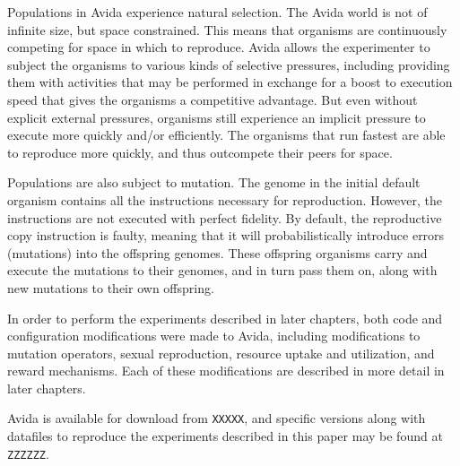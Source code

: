 Populations in Avida experience natural selection. The Avida world is not of infinite size, but space constrained. This means that organisms are continuously competing for space in which to reproduce.  Avida allows the experimenter to subject the organisms to various kinds of selective pressures, including providing them with activities that may be performed in exchange for a boost to execution speed that gives the organisms a competitive advantage. But even without explicit external pressures, organisms still experience an implicit pressure to execute more quickly and/or efficiently. The organisms that run fastest are able to reproduce more quickly, and thus outcompete their peers for space.  

Populations are also subject to mutation. The genome in the initial default organism contains all the instructions necessary for reproduction. However, the instructions are not executed with perfect fidelity. By default, the reproductive copy instruction is faulty, meaning that it will probabilistically introduce errors (mutations) into the offspring genomes. These offspring organisms carry and execute the mutations to their genomes, and in turn pass them on, along with new mutations to their own offspring.

In order to perform the experiments described in later chapters, both code and configuration modifications were made to Avida, including modifications to mutation operators, sexual reproduction, resource uptake and utilization, and reward mechanisms. Each of these modifications are described in more detail in later chapters.

Avida is available for download from \verb|XXXXX|, and specific versions along with datafiles to reproduce the experiments described in this paper may be found at \verb|ZZZZZZ|.